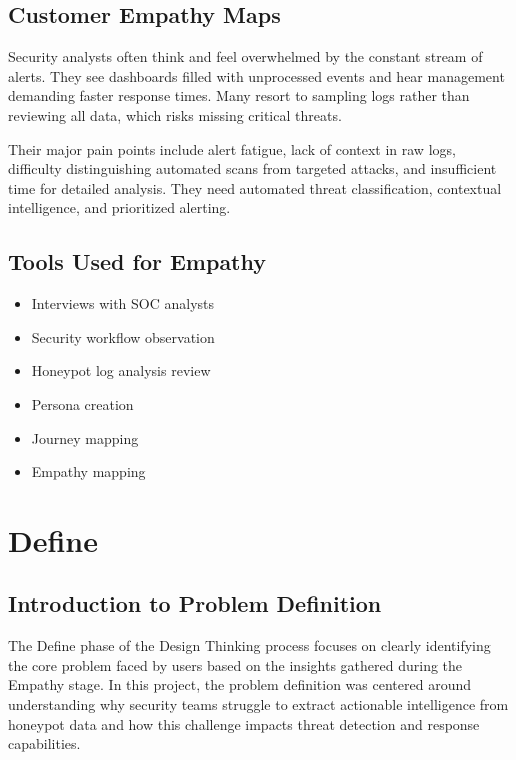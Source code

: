 \documentclass[12pt,a4paper]{report}
\begin{document}
\section{Customer Empathy Maps}

Security analysts often think and feel overwhelmed by the constant stream of alerts. They see dashboards filled with unprocessed events and hear management demanding faster response times. Many resort to sampling logs rather than reviewing all data, which risks missing critical threats.

Their major pain points include alert fatigue, lack of context in raw logs, difficulty distinguishing automated scans from targeted attacks, and insufficient time for detailed analysis. They need automated threat classification, contextual intelligence, and prioritized alerting.

\section{Tools Used for Empathy}

\begin{itemize}
\item Interviews with SOC analysts
\item Security workflow observation
\item Honeypot log analysis review
\item Persona creation
\item Journey mapping
\item Empathy mapping
\end{itemize}


\chapter{Define}
\thispagestyle{fancy}

\section{Introduction to Problem Definition}

The Define phase of the Design Thinking process focuses on clearly identifying the core problem faced by users based on the insights gathered during the Empathy stage. In this project, the problem definition was centered around understanding why security teams struggle to extract actionable intelligence from honeypot data and how this challenge impacts threat detection and response capabilities.
\end{document}
